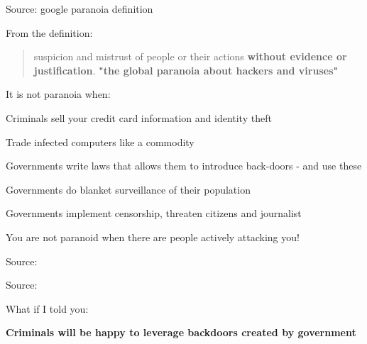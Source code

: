 \documentclass[20pt,landscape,a4paper,footrule]{foils}
\begin{document}

Source: google paranoia definition


From the definition:
\begin{quote}
suspicion and mistrust of people or their actions {\bf without evidence or justification}.
{\bf "the global paranoia about hackers and viruses"}
\end{quote}

\begin{list1}
\item It is not paranoia when:
\begin{list2}
\item Criminals sell your credit card information and identity theft
\item Trade infected computers like a commodity
\item Governments write laws that allows them to introduce back-doors - and use these
\item Governments do blanket surveillance of their population
\item Governments implement censorship, threaten citizens and journalist
\end{list2}
\end{list1}

\vskip 1cm
\centerline{You are not paranoid when there are people actively attacking you!}




{\small Source: 
}




{\small Source: 
}





What if I told you:

{\Large \bf Criminals will be happy to leverage backdoors created by government}
\end{document}
